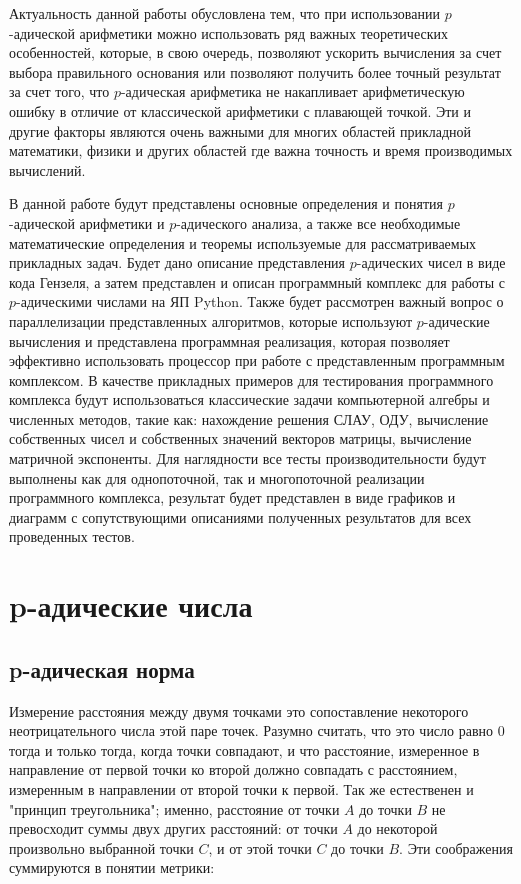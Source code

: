 \documentclass[master, och, diploma, times]{sty/SCWorks}
\theoremstyle{plain}
\theoremstyle{definition}
\numberwithin{equation}{section}
\begin{document}
Актуальность данной работы обусловлена тем, что при использовании $p$-адической арифметики можно использовать ряд важных теоретических особенностей, которые, в свою очередь, позволяют ускорить вычисления за счет выбора правильного основания или  позволяют получить более точный результат за счет того, что $p$-адическая арифметика не накапливает арифметическую ошибку в отличие от классической арифметики с плавающей точкой. Эти и другие факторы являются очень важными для многих областей прикладной математики, физики и других областей где важна точность и время производимых вычислений.

В данной работе будут представлены основные определения и понятия $p$-адической арифметики и $p$-адического анализа, а также все необходимые математические определения и теоремы используемые для рассматриваемых прикладных задач. Будет дано описание представления $p$-адических чисел в виде кода Гензеля, а затем представлен и описан программный комплекс для работы с $p$-адическими числами на ЯП Python. Также будет рассмотрен важный вопрос о параллелизации представленных алгоритмов, которые используют $p$-адические вычисления и представлена программная реализация, которая позволяет эффективно использовать процессор при работе с представленным программным комплексом. В качестве прикладных примеров для тестирования программного комплекса будут использоваться классические задачи компьютерной алгебры и численных методов, такие как: нахождение решения СЛАУ, ОДУ, вычисление собственных чисел и собственных значений векторов матрицы, вычисление матричной экспоненты. Для наглядности все тесты производительности будут выполнены  как для однопоточной, так и многопоточной реализации программного комплекса, результат будет представлен в виде графиков и диаграмм с сопутствующими описаниями полученных результатов для всех проведенных тестов.

\section{p-адические числа}

\subsection{p-адическая норма}

Измерение расстояния между двумя точками это сопоставление некоторого неотрицательного числа этой паре точек. Разумно считать, что это число равно $0$ тогда и только тогда, когда точки совпадают, и что расстояние, измеренное в направление от первой точки ко второй должно совпадать с расстоянием, измеренным в направлении от второй точки к первой. Так же естественен и "принцип треугольника"; именно, расстояние от точки $A$ до точки $B$ не превосходит суммы двух других расстояний: от точки $A$ до некоторой произвольно выбранной точки $C$, и от этой точки $C$ до точки $B$. Эти соображения суммируются в понятии метрики:
\end{document}
